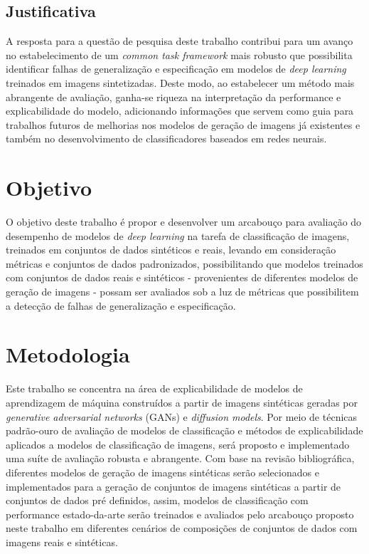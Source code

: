 \subsection{Justificativa}

A resposta para a questão de pesquisa deste trabalho contribui para um avanço no estabelecimento de um \textit{common task framework}\cite{ctf} mais robusto que possibilita identificar falhas de generalização e especificação em modelos de \textit{deep learning} treinados em imagens sintetizadas. Deste modo, ao estabelecer um método mais abrangente de avaliação, ganha-se riqueza na interpretação da performance e explicabilidade do modelo, adicionando informações que servem como guia para trabalhos futuros de melhorias nos modelos de geração de imagens já existentes e também no desenvolvimento de classificadores baseados em redes neurais.

\section{Objetivo}

O objetivo deste trabalho é propor e desenvolver um arcabouço para avaliação do desempenho de modelos de \textit{deep learning} na tarefa de classificação de imagens, treinados em conjuntos de dados sintéticos e reais, levando em consideração métricas e conjuntos de dados padronizados, possibilitando que modelos treinados com conjuntos de dados reais e sintéticos - provenientes de diferentes modelos de geração de imagens - possam ser avaliados sob a luz de métricas que possibilitem a detecção de falhas de generalização e especificação.

\section{Metodologia}
\label{secao:metodologia}

Este trabalho se concentra na área de explicabilidade de modelos de aprendizagem de máquina construídos a partir de imagens sintéticas geradas por \textit{generative adversarial networks} (GANs) e \textit{diffusion models}. Por meio de técnicas padrão-ouro de avaliação de modelos de classificação e métodos de explicabilidade aplicados a modelos de classificação de imagens, será proposto e implementado uma suíte de avaliação robusta e abrangente. Com base na revisão bibliográfica, diferentes modelos de geração de imagens sintéticas serão selecionados e implementados para a geração de conjuntos de imagens sintéticas a partir de conjuntos de dados pré definidos, assim, modelos de classificação com performance estado-da-arte serão treinados e avaliados pelo arcabouço proposto neste trabalho em diferentes cenários de composições de conjuntos de dados com imagens reais e sintéticas.

